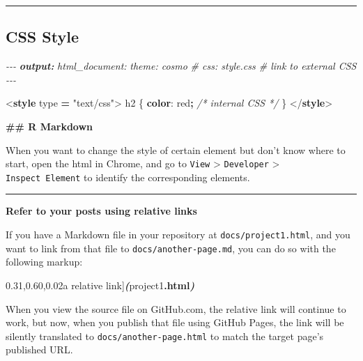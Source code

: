 \documentclass[
  a4paper,
  twoside,
  openright]{book}
\newenvironment{Shaded}{\begin{snugshade}}{\end{snugshade}}
\newcommand{\AnnotationTok}[1]{\textcolor[rgb]{0.56,0.35,0.01}{\textbf{\textit{#1}}}}
\newcommand{\CharTok}[1]{\textcolor[rgb]{0.31,0.60,0.02}{#1}}
\newcommand{\CommentTok}[1]{\textcolor[rgb]{0.56,0.35,0.01}{\textit{#1}}}
\newcommand{\ConstantTok}[1]{\textcolor[rgb]{0.56,0.35,0.01}{#1}}
\newcommand{\DataTypeTok}[1]{\textcolor[rgb]{0.13,0.29,0.53}{#1}}
\newcommand{\ExtensionTok}[1]{#1}
\newcommand{\FunctionTok}[1]{\textcolor[rgb]{0.13,0.29,0.53}{\textbf{#1}}}
\newcommand{\InformationTok}[1]{\textcolor[rgb]{0.56,0.35,0.01}{\textbf{\textit{#1}}}}
\newcommand{\KeywordTok}[1]{\textcolor[rgb]{0.13,0.29,0.53}{\textbf{#1}}}
\newcommand{\NormalTok}[1]{#1}
\newcommand{\OperatorTok}[1]{\textcolor[rgb]{0.81,0.36,0.00}{\textbf{#1}}}
\newcommand{\OtherTok}[1]{\textcolor[rgb]{0.56,0.35,0.01}{#1}}
\newcommand{\SpecialStringTok}[1]{\textcolor[rgb]{0.31,0.60,0.02}{#1}}
\newcommand{\StringTok}[1]{\textcolor[rgb]{0.31,0.60,0.02}{#1}}
\theoremstyle{definition}
\theoremstyle{definition}
\theoremstyle{definition}
\theoremstyle{definition}
\theoremstyle{remark}
\begin{document}
\begin{center}\rule{0.5\linewidth}{0.5pt}\end{center}

\subsection*{CSS Style}\label{css-style}

\begin{Shaded}
\begin{Highlighting}[]
\CommentTok{{-}{-}{-}}
\AnnotationTok{output:}\CommentTok{ }
\CommentTok{  html\_document:}
\CommentTok{    theme: cosmo}
\CommentTok{   \# css: style.css \# link to external CSS}
\CommentTok{{-}{-}{-}}

\DataTypeTok{\textless{}}\KeywordTok{style}\OtherTok{ type }\OperatorTok{=} \StringTok{"text/css"}\DataTypeTok{\textgreater{}} 
\NormalTok{h2 \{}
  \KeywordTok{color}\CharTok{:} \ConstantTok{red}\OperatorTok{;} \CommentTok{/* internal CSS */}
\NormalTok{\}}
\DataTypeTok{\textless{}/}\KeywordTok{style}\DataTypeTok{\textgreater{}}

\FunctionTok{\#\# R Markdown}
\end{Highlighting}
\end{Shaded}

When you want to change the style of certain element but don't know where to start, open the html in Chrome, and go to \texttt{View} \textgreater{} \texttt{Developer} \textgreater{} \texttt{Inspect\ Element} to identify the corresponding elements.

\begin{center}\rule{0.5\linewidth}{0.5pt}\end{center}

\textbf{Refer to your posts using relative links}

If you have a Markdown file in your repository at \texttt{docs/project1.html}, and you want to link from that file to \texttt{docs/another-page.md}, you can do so with the following markup:

\begin{Shaded}
\begin{Highlighting}[]
\ExtensionTok{[}\SpecialStringTok{a relative link}\ExtensionTok{]}\InformationTok{(}\NormalTok{project1}\FunctionTok{.html}\InformationTok{)}
\end{Highlighting}
\end{Shaded}

When you view the source file on GitHub.com, the relative link will continue to work, but now, when you publish that file using GitHub Pages, the link will be silently translated to \texttt{docs/another-page.html} to match the target page's published URL.
\end{document}
